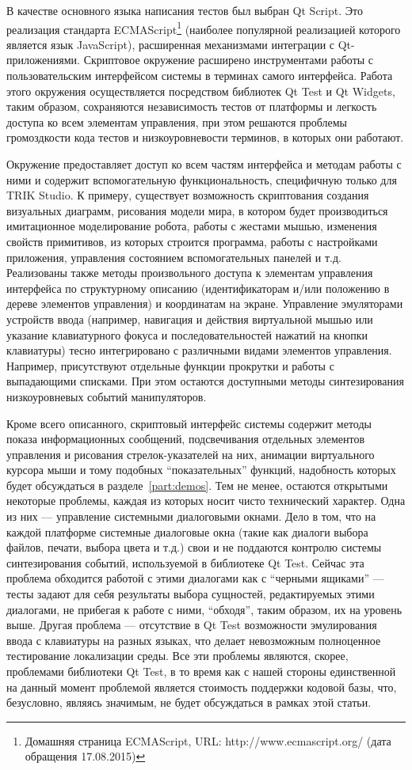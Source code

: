 \documentclass[conference]{IEEEtran}
\begin{document}
В качестве основного языка написания тестов был выбран Qt Script. Это реализация стандарта 
ECMAScript\footnote{Домашняя страница ECMAScript, URL: http://www.ecmascript.org/ (дата обращения 17.08.2015)} 
(наиболее популярной реализацией которого является язык JavaScript), расширенная механизмами интеграции 
с Qt-приложениями. Скриптовое окружение расширено инструментами работы с пользовательским интерфейсом системы 
в терминах самого интерфейса. Работа этого окружения осуществляется посредством библиотек Qt Test и Qt Widgets, 
таким образом, сохраняются независимость тестов от платформы и легкость доступа ко всем элементам управления, 
при этом решаются проблемы громоздкости кода тестов и низкоуровневости терминов, в которых они работают.

Окружение предоставляет доступ ко всем частям интерфейса и методам работы с ними и содержит вспомогательную функциональность, 
специфичную только для TRIK Studio. К примеру, существует возможность скриптования создания визуальных диаграмм, 
рисования модели мира, в котором будет производиться имитационное моделирование робота, работы с жестами мышью, 
изменения свойств примитивов, из которых строится программа, работы с настройками приложения, управления 
состоянием вспомогательных панелей и т.д. Реализованы также методы произвольного доступа к элементам управления 
интерфейса по структурному описанию (идентификаторам и/или положению в дереве элементов управления) и координатам 
на экране. Управление эмуляторами устройств ввода (например, навигация и действия виртуальной мышью или указание 
клавиатурного фокуса и последовательностей нажатий на кнопки клавиатуры) тесно интегрировано с различными 
видами элементов управления. Например, присутствуют отдельные функции прокрутки и работы с выпадающими 
списками. При этом остаются доступными методы синтезирования низкоуровневых событий манипуляторов. 

Кроме всего описанного, скриптовый интерфейс системы содержит методы показа информационных сообщений, подсвечивания 
отдельных элементов управления и рисования стрелок-указателей на них, анимации виртуального курсора мыши 
и тому подобных "`показательных"' функций, надобность которых будет обсуждаться в разделе~\ref{part:demos}. 
Тем не менее, остаются открытыми некоторые проблемы, каждая из которых носит чисто технический характер. 
Одна из них --- управление системными диалоговыми окнами. Дело в том, что на каждой платформе системные 
диалоговые окна (такие как диалоги выбора файлов, печати, выбора цвета и т.д.) свои и не поддаются контролю 
системы синтезирования событий, используемой в библиотеке Qt Test. Сейчас эта проблема обходится работой 
с этими диалогами как с "`черными ящиками"' --- тесты задают для себя результаты выбора сущностей, редактируемых 
этими диалогами, не прибегая к работе с ними, "`обходя"', таким образом, их на уровень выше. Другая проблема 
--- отсутствие в Qt Test возможности эмулирования ввода с клавиатуры на разных языках, что делает невозможным 
полноценное тестирование локализации среды. Все эти проблемы являются, скорее, проблемами библиотеки Qt Test, 
в то время как с нашей стороны единственной на данный момент проблемой является стоимость поддержки кодовой базы, 
что, безусловно, являясь значимым, не будет обсуждаться в рамках этой статьи.
\end{document}
